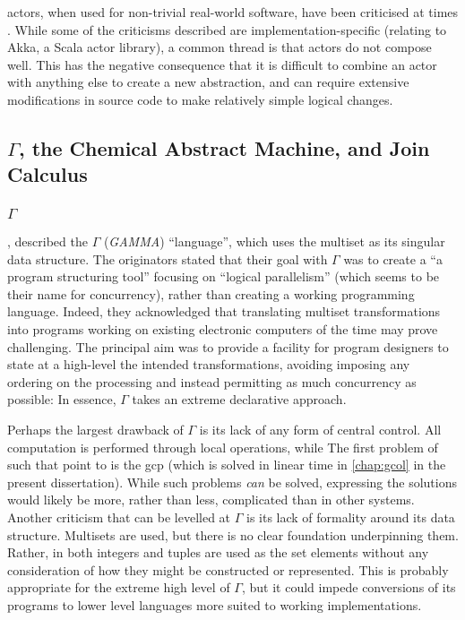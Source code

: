\Glspl{actor}, when used for non-trivial real-world software, have been criticised at times \eg{} \cite{Welsh2013,Stucchio2013}.  While some of the criticisms described are implementation-specific (relating to Akka, a Scala \gls{actor} library), a common thread is that \glspl{actor} do not compose well.  This has the negative consequence that it is difficult to combine an \gls{actor} with anything else to create a new abstraction, and can require extensive modifications in source code to make relatively simple logical changes.

\subsection[GAMMA, the Chemical Abstract Machine, and Join Calculus]{\(\Gamma\), the Chemical Abstract Machine, and Join Calculus}

\subsubsection{\(\Gamma\)}
\citeauthor{Banatre1993} \cite{Banatre1993}, described the \(\Gamma\) (\emph{GAMMA}) ``language'', which uses the multiset as its singular data structure.  The originators stated that their goal with \(\Gamma\) was to create a \enquote{a program structuring tool} focusing on \enquote{logical parallelism} (which seems to be their name for concurrency), rather than creating a working programming language.  Indeed, they acknowledged that translating multiset transformations into programs working on existing electronic computers of the time may prove challenging.  The principal aim was to provide a facility for program designers to state at a high-level the intended transformations, avoiding imposing any ordering on the processing and instead permitting as much concurrency as possible:    In essence, \(\Gamma\) takes an extreme declarative approach.

Perhaps the largest drawback of \(\Gamma\) is its lack of any form of central control.  All computation is performed through local operations, while   The first problem of such that \citeauthor{Banatre1993} point to is the \gls{gcp} (which is solved in linear time in \cref{chap:gcol} in the present dissertation).  While such problems \emph{can} be solved, expressing the solutions would likely be more, rather than less, complicated than in other systems.  Another criticism that can be levelled at \(\Gamma\) is its lack of formality around its data structure.  Multisets are used, but there is no clear foundation underpinning them.  Rather, in \cite{Banatre1993} both integers and tuples are used as the set elements without any consideration of how they might be constructed or represented.  This is probably appropriate for the extreme high level of \(\Gamma\), but it could impede conversions of its programs to lower level languages more suited to working implementations.

